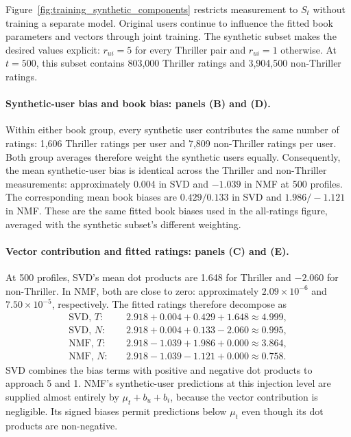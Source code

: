 Figure~\ref{fig:training_synthetic_components} restricts measurement to $S_t$ without training a separate model. Original users continue to influence the fitted book parameters and vectors through joint training. The synthetic subset makes the desired values explicit: $r_{ui}=5$ for every Thriller pair and $r_{ui}=1$ otherwise. At $t=500$, this subset contains 803,000 Thriller ratings and 3,904,500 non-Thriller ratings.

\paragraph{Synthetic-user bias and book bias: panels (B) and (D).}
Within either book group, every synthetic user contributes the same number of ratings: 1,606 Thriller ratings per user and 7,809 non-Thriller ratings per user. Both group averages therefore weight the synthetic users equally. Consequently, the mean synthetic-user bias is identical across the Thriller and non-Thriller measurements: approximately 0.004 in SVD and $-1.039$ in NMF at 500 profiles. The corresponding mean book biases are $0.429/0.133$ in SVD and $1.986/-1.121$ in NMF. These are the same fitted book biases used in the all-ratings figure, averaged with the synthetic subset's different weighting.

\paragraph{Vector contribution and fitted ratings: panels (C) and (E).}
At 500 profiles, SVD's mean dot products are 1.648 for Thriller and $-2.060$ for non-Thriller. In NMF, both are close to zero: approximately $2.09\times10^{-6}$ and $7.50\times10^{-5}$, respectively. The fitted ratings therefore decompose as
\begin{equation}
\label{eq:training_synthetic_numeric}
\begin{aligned}
\text{SVD, }T:&\quad 2.918+0.004+0.429+1.648\approx4.999,\\
\text{SVD, }N:&\quad 2.918+0.004+0.133-2.060\approx0.995,\\
\text{NMF, }T:&\quad 2.918-1.039+1.986+0.000\approx3.864,\\
\text{NMF, }N:&\quad 2.918-1.039-1.121+0.000\approx0.758.
\end{aligned}
\end{equation}
SVD combines the bias terms with positive and negative dot products to approach 5 and 1. NMF's synthetic-user predictions at this injection level are supplied almost entirely by $\mu_t+b_u+b_i$, because the vector contribution is negligible. Its signed biases permit predictions below $\mu_t$ even though its dot products are non-negative.

